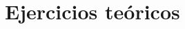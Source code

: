 \documentclass[../../ASSD_TP1_G7.tex]{subfiles}
\begin{document}
\chapter*{Ejercicios te\'oricos}
\end{document}

